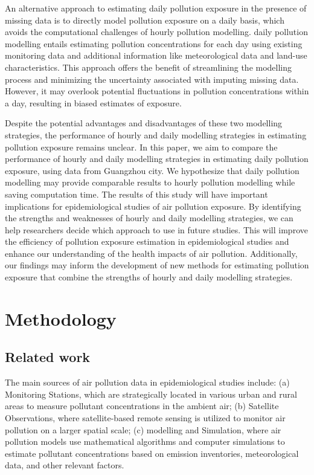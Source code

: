 \documentclass[
  12,
]{article}
\begin{document}
An alternative approach to estimating daily pollution exposure in the
presence of missing data is to directly model pollution exposure on a
daily basis, which avoids the computational challenges of hourly
pollution modelling. daily pollution modelling entails estimating
pollution concentrations for each day using existing monitoring data and
additional information like meteorological data and land-use
characteristics. This approach offers the benefit of streamlining the
modelling process and minimizing the uncertainty associated with
imputing missing data. However, it may overlook potential fluctuations
in pollution concentrations within a day, resulting in biased estimates
of exposure.

Despite the potential advantages and disadvantages of these two
modelling strategies, the performance of hourly and daily modelling
strategies in estimating pollution exposure remains unclear. In this
paper, we aim to compare the performance of hourly and daily modelling
strategies in estimating daily pollution exposure, using data from
Guangzhou city. We hypothesize that daily pollution modelling may
provide comparable results to hourly pollution modelling while saving
computation time. The results of this study will have important
implications for epidemiological studies of air pollution exposure. By
identifying the strengths and weaknesses of hourly and daily modelling
strategies, we can help researchers decide which approach to use in
future studies. This will improve the efficiency of pollution exposure
estimation in epidemiological studies and enhance our understanding of
the health impacts of air pollution. Additionally, our findings may
inform the development of new methods for estimating pollution exposure
that combine the strengths of hourly and daily modelling strategies.

\hypertarget{methodology}{%
\section{Methodology}\label{methodology}}

\hypertarget{related-work}{%
\subsection{Related work}\label{related-work}}

The main sources of air pollution data in epidemiological studies
include: (a) Monitoring Stations, which are strategically located in
various urban and rural areas to measure pollutant concentrations in the
ambient air; (b) Satellite Observations, where satellite-based remote
sensing is utilized to monitor air pollution on a larger spatial scale;
(c) modelling and Simulation, where air pollution models use
mathematical algorithms and computer simulations to estimate pollutant
concentrations based on emission inventories, meteorological data, and
other relevant factors.
\end{document}
